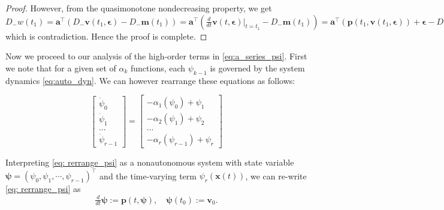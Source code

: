\documentclass[letterpaper, 10 pt, journal, twoside]{IEEEtran}
\theoremstyle{plain}
\newcommand{\myvar}[1]{\bm{#1}}
\begin{document}
\begin{proof}
 	
 	However, from the quasimonotone nondecreasing property, we get $D_{-}w(t_1)  = \myvar{a}^\top ( D_{-} \myvar{v}(t_1,\myvar{\epsilon}) - D_{-}\myvar{m}(t_1)) 
 	     = \myvar{a}^\top ( \tfrac{d}{dt} \myvar{v}(t,\myvar{\epsilon})|_{t = t_1} - D_{-}\myvar{m}(t_1))  = \myvar{a}^\top ( \myvar{p}(t_1, \myvar{v}(t_1,\myvar{\epsilon})) + \myvar{\epsilon}- D_{-}\myvar{m}(t_1)) 	    	>\myvar{a}^\top ( \myvar{p}(t_1, \myvar{v}(t_1,\myvar{\epsilon}))  - D_{-}\myvar{m}(t_1)) \ge 0,$
 	which is contradiction. Hence the proof is complete.
 \end{proof}

Now we proceed to our analysis of the high-order terms in \eqref{eq:a_series_psi}. First we note that for a given set of $\alpha_k$ functions, each $\psi_{k-1}$ is governed by the system dynamics \eqref{eq:auto_dyn}. We can however rearrange these equations as follows: 

\begin{equation} \label{eq: rerrange_psi}
\begin{bmatrix}
\dot{\psi}_0\\
\dot{\psi}_1 \\
... \\
\dot{\psi}_{r-1}
\end{bmatrix} = \begin{bmatrix}
-\alpha_1 (\psi_0) + \psi_1\\
-\alpha_2 (\psi_1) + \psi_2 \\
... \\
-\alpha_r (\psi_{r-1}) + \psi_{r}
\end{bmatrix} 
\end{equation}


Interpreting \eqref{eq: rerrange_psi} as a nonautonomous  system with state variable $ \myvar{\psi} = (\psi_0, \psi_1, \cdots,\psi_{r-1})^\top $ and the time-varying term $ \psi_{r}(\myvar{x}(t)) $, we can re-write \eqref{eq: rerrange_psi} as
 \begin{equation}\label{eq:psi_dyn}
 \tfrac{d}{dt}\myvar{\psi} := \myvar{p}(t,\myvar{\psi}), \quad \myvar{\psi}(t_0) := \myvar{v}_0.
 \end{equation}
 
\end{document}
